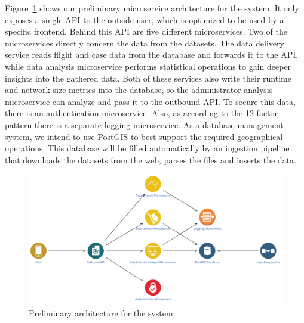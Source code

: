 \documentclass[12pt]{article}
\begin{document}
	Figure~\ref{fig:architecture} shows our preliminary microservice architecture for the system. It only exposes a single API to the outside user, which is optimized to be used by a specific frontend. Behind this API are five different microservices. Two of the microservices directly concern the data from the datasets. The data delivery service reads flight and case data from the database and forwards it to the API, while data analysis microservice performs statistical operations to gain deeper insights into the gathered data. Both of these services also write their runtime and network size metrics into the database, so the administrator analysis microservice can analyze and pass it to the outbound API. To secure this data, there is an authentication microservice. Also, as according to the 12-factor pattern there is a separate logging microservice. As a database management system, we intend to use PostGIS to best support the required geographical operations. This database will be filled automatically by an ingestion pipeline that downloads the datasets from the web, parses the files and inserts the data.
	
	\begin{figure}[h!]
		\centering
		\includegraphics[scale=0.38]{architecture.png}
		\caption{Preliminary architecture for the system.}
		\label{fig:architecture}
	\end{figure}

	

	
	
\end{document}
